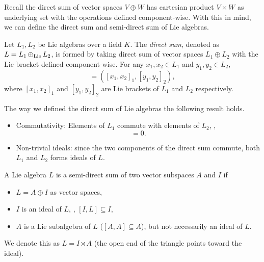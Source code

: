 Recall the direct sum of vector spaces \(V \oplus W\) has cartesian product \(V \times W\) as underlying set with the operations defined component-wise. With this in mind, we can define the direct sum and semi-direct sum of Lie algebras.
\begin{definition}
    Let \(L_1, L_2\) be Lie algebras over a field \(K\). The \emph{direct sum}, denoted as \(L = L_1 \operatorname{\oplus_{\mathrm{Lie}}} L_2\), is formed by taking direct sum of vector spaces \(L_1 \oplus L_2\) with the Lie bracket defined component-wise. For any \(x_1, x_2 \in L_1\) and \(y_1, y_2 \in L_2\),
    \begin{equation*}
        [(x_1, y_1), (x_2, y_2)] = ([x_1, x_2]_1, [y_1, y_2]_2),
    \end{equation*}
    where \([x_1, x_2]_1\) and \([y_1, y_2]_2\) are Lie brackets of \(L_1\) and \(L_2\) respectively.
\end{definition}
\begin{remark}
    The way we defined the direct sum of Lie algebras the following result holds.
    \begin{itemize}[(i)]
        \item Commutativity: Elements of \(L_1\) commute with elements of \(L_2\), \ie,
              \begin{equation*}
                  [L_1, L_2] = 0.
              \end{equation*}
        \item Non-trivial ideals: since the two components of the direct sum commute, both \(L_1\) and \(L_2\) forms ideals of \(L\).
    \end{itemize}
\end{remark}
\begin{definition}
    A Lie algebra \(L\) is a semi-direct sum of two vector subspaces \(A\) and \(I\) if
    \begin{itemize}
        \item \(L = A \oplus I\) as vector spaces,
        \item \(I\) is an ideal of \(L\), \ie, \([I, L] \subseteq I\),
        \item \(A\) is a Lie subalgebra of \(L\) (\([A, A] \subseteq A\)), but not necessarily an ideal of \(L\).
    \end{itemize}
    We denote this as \(L = I \rtimes A\) (the open end of the triangle points toward the ideal).
\end{definition}

